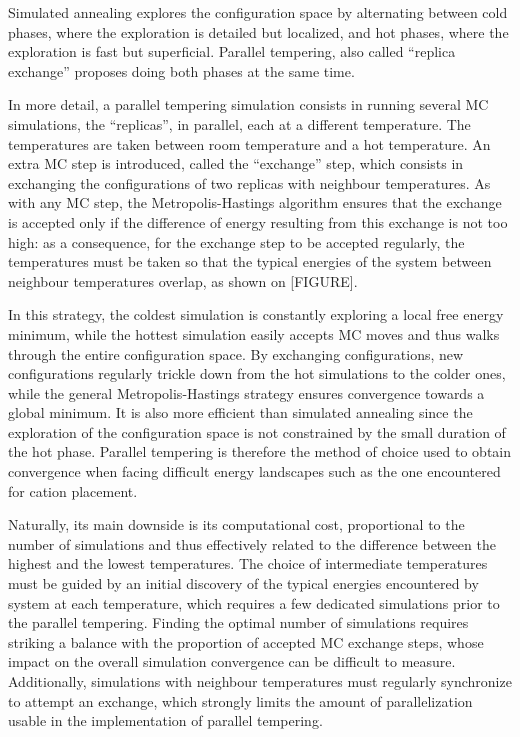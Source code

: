 \documentclass[main.tex]{subfiles}
\begin{document}
Simulated annealing explores the configuration space by alternating between cold phases, where the exploration is detailed but localized, and hot phases, where the exploration is fast but superficial. Parallel tempering, also called ``replica exchange'' proposes doing both phases at the same time.

In more detail, a parallel tempering simulation consists in running several MC simulations, the ``replicas'', in parallel, each at a different temperature. The temperatures are taken between room temperature and a hot temperature. An extra MC step is introduced, called the ``exchange'' step, which consists in exchanging the configurations of two replicas with neighbour temperatures. As with any MC step, the Metropolis-Hastings algorithm ensures that the exchange is accepted only if the difference of energy resulting from this exchange is not too high: as a consequence, for the exchange step to be accepted regularly, the temperatures must be taken so that the typical energies of the system between neighbour temperatures overlap, as shown on [FIGURE].

In this strategy, the coldest simulation is constantly exploring a local free energy minimum, while the hottest simulation easily accepts MC moves and thus walks through the entire configuration space. By exchanging configurations, new configurations regularly trickle down from the hot simulations to the colder ones, while the general Metropolis-Hastings strategy ensures convergence towards a global minimum. It is also more efficient than simulated annealing since the exploration of the configuration space is not constrained by the small duration of the hot phase. Parallel tempering is therefore the method of choice used to obtain convergence when facing difficult energy landscapes such as the one encountered for cation placement.

Naturally, its main downside is its computational cost, proportional to the number of simulations and thus effectively related to the difference between the highest and the lowest temperatures. The choice of intermediate temperatures must be guided by an initial discovery of the typical energies encountered by system at each temperature, which requires a few dedicated simulations prior to the parallel tempering. Finding the optimal number of simulations requires striking a balance with the proportion of accepted MC exchange steps, whose impact on the overall simulation convergence can be difficult to measure. Additionally, simulations with neighbour temperatures must regularly synchronize to attempt an exchange, which strongly limits the amount of parallelization usable in the implementation of parallel tempering.
\end{document}
